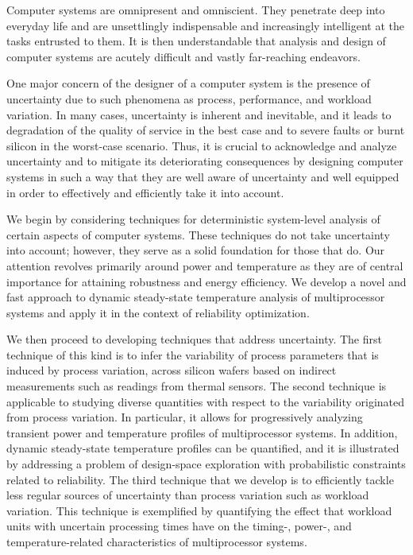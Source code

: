 Computer systems are omnipresent and omniscient. They penetrate deep into
everyday life and are unsettlingly indispensable and increasingly intelligent at
the tasks entrusted to them. It is then understandable that analysis and design
of computer systems are acutely difficult and vastly far-reaching endeavors.

One major concern of the designer of a computer system is the presence of
uncertainty due to such phenomena as process, performance, and workload
variation. In many cases, uncertainty is inherent and inevitable, and it leads
to degradation of the quality of service in the best case and to severe faults
or burnt silicon in the worst-case scenario. Thus, it is crucial to acknowledge
and analyze uncertainty and to mitigate its deteriorating consequences by
designing computer systems in such a way that they are well aware of uncertainty
and well equipped in order to effectively and efficiently take it into account.

We begin by considering techniques for deterministic system-level analysis of
certain aspects of computer systems. These techniques do not take uncertainty
into account; however, they serve as a solid foundation for those that do. Our
attention revolves primarily around power and temperature as they are of central
importance for attaining robustness and energy efficiency. We develop a novel
and fast approach to dynamic steady-state temperature analysis of multiprocessor
systems and apply it in the context of reliability optimization.

We then proceed to developing techniques that address uncertainty. The first
technique of this kind is to infer the variability of process parameters that is
induced by process variation, across silicon wafers based on indirect
measurements such as readings from thermal sensors. The second technique is
applicable to studying diverse quantities with respect to the variability
originated from process variation. In particular, it allows for progressively
analyzing transient power and temperature profiles of multiprocessor systems. In
addition, dynamic steady-state temperature profiles can be quantified, and it is
illustrated by addressing a problem of design-space exploration with
probabilistic constraints related to reliability. The third technique that we
develop is to efficiently tackle less regular sources of uncertainty than
process variation such as workload variation. This technique is exemplified by
quantifying the effect that workload units with uncertain processing times have
on the timing-, power-, and temperature-related characteristics of
multiprocessor systems.


